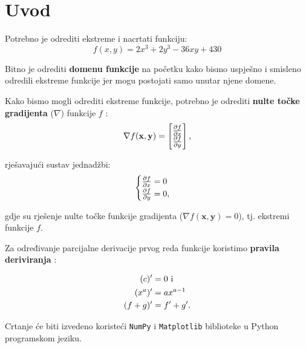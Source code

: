 \chapter{Uvod}

Potrebno je odrediti ekstreme i nacrtati funkciju:
\begin{equation}
f(x, y) = 2x^3 + 2y^3 - 36xy + 430
\end{equation}

Bitno je odrediti {\bf domenu funkcije} na početku kako bismo uspješno i smisleno odredili ekstreme funkcije jer mogu postojati samo unutar njene domene.

Kako bismo mogli odrediti ekstreme funkcije, potrebno je odrediti {\bf nulte točke gradijenta} ($\nabla$) funkcije $f$ \cite{ccalc}:
\begin{equation}
    \nabla f(\mathbf{x}, \mathbf{y}) = \begin{bmatrix}
        \frac{\partial f}{\partial x} \\
        \frac{\partial f}{\partial y}
    \end{bmatrix}\textnormal{,}
\end{equation}

rješavajući sustav jednadžbi:
\begin{equation}
    \begin{cases}
        \frac{\partial f}{\partial x} = 0 \\
        \frac{\partial f}{\partial y} = 0 \textnormal{,}
    \end{cases}
\end{equation}

gdje su rješenje nulte točke funkcije gradijenta ($\nabla f(\mathbf{x}, \mathbf{y}) = 0$), tj. ekstremi funkcije $f$.

Za određivanje parcijalne derivacije prvog reda funkcije koristimo {\bf pravila deriviranja} \cite{kolegij}:

\begin{align}
    (c)' &= 0 \text{ i }\\
    (x^a)' &= ax^{a-1}\\
    (f + g)' &= f' + g' \textnormal{.}
\end{align}

\vspace*{20pt}

Crtanje će biti izvedeno koristeći \verb|NumPy| i \verb|Matplotlib| biblioteke u Python programskom jeziku.\par

\newpage
